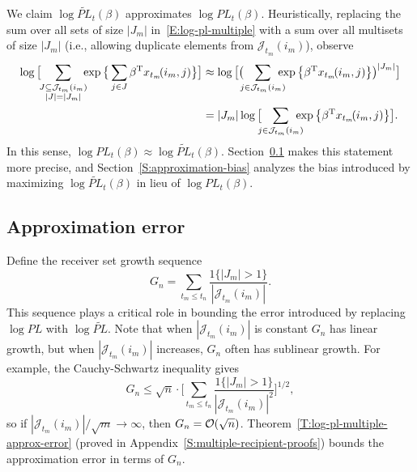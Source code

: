 \documentclass[final]{statsoc}
\begin{document}
We claim $\log \widetilde{\mathit{PL}}_t(\beta)$ approximates
$\log \mathit{PL}_t(\beta)$.  Heuristically, replacing the
sum over all sets of size $|J_m|$ in~\eqref{E:log-pl-multiple}
with a sum over all multisets of size $|J_m|$ (i.e., allowing
duplicate elements from $\mathcal{J}_{t_m}(i_m)$), observe
\begin{align*}
    \log\big[\!\!
        \sum_{\substack{J \subseteq \mathcal{J}_{t_m}(i_m) \\
              |J| = |J_m|}}\!\!\!
            \exp\big\{
                \sum_{j \in J}
                    \beta^\trans x_{t_m}\!(i_m, j)
            \big\}
    \big]
    &\approx
        \log\big[
            \big(\!\!\!
            \sum_{j \in \mathcal{J}_{t_m}(i_m)}\!\!\!\!\!
                \exp\big\{
                    \beta^\trans x_{t_m}\!(i_m, j)
                \big\}
        \big)^{|J_m|}
        \big] \\
    &=
        |J_m|
        \log\big[\!\!\!
            \sum_{j \in \mathcal{J}_{t_m}(i_m)}\!\!\!\!\!
                \exp\big\{
                    \beta^\trans x_{t_m}\!(i_m, j)
                \big\}
        \big].
\end{align*}
In this sense,
$\log \mathit{PL}_t(\beta) \approx \log \widetilde{\mathit{PL}}_t(\beta)$.
Section~\ref{S:approximation-error} makes this statement more precise,
and Section~\ref{S:approximation-bias} analyzes the bias introduced by
maximizing $\log \widetilde{\mathit{PL}}_t(\beta)$ in lieu of
$\log \mathit{PL}_t(\beta)$.

\subsection{Approximation error}\label{S:approximation-error}
Define the receiver set growth sequence
\begin{equation}\label{E:growth-constant}
    G_n
        =
            \sum_{t_m \leq t_n}
                \frac{1\{|J_m| > 1\}}{|\mathcal{J}_{t_m}(i_m)|}.
\end{equation}
This sequence plays a critical role in bounding the error introduced by
replacing $\log \mathit{PL}$ with $\log \widetilde{\mathit{PL}}$.
Note that when $|\mathcal{J}_{t_m}(i_m)|$ is constant $G_n$ has linear
growth, but when $|\mathcal{J}_{t_m}(i_m)|$ increases, $G_n$ often has
sublinear growth.  For example, the Cauchy-Schwartz inequality gives
\[
    G_n
        \leq
            \sqrt{n}
            \cdot
            \bigg[
                \sum_{t_m \leq t_n}
                    \frac{1\{|J_m| > 1\}}{|\mathcal{J}_{t_m}(i_m)|^2}
            \bigg]^{1/2},
\]
so if $|\mathcal{J}_{t_m}(i_m)|/\sqrt{m} \to \infty$, then
$G_n = \mathcal{O}(\sqrt{n})$.  Theorem~\ref{T:log-pl-multiple-approx-error}
(proved in Appendix~\ref{S:multiple-recipient-proofs})
bounds the approximation error in terms of $G_n$. 
\end{document}
